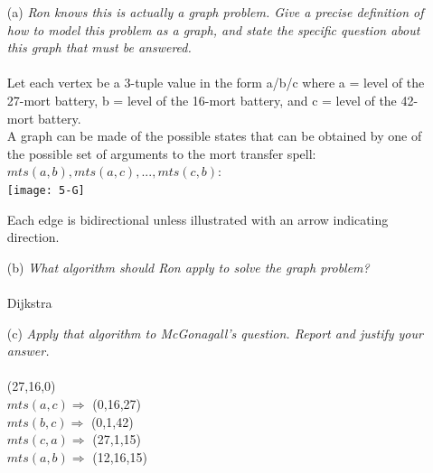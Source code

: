 \documentclass[12pt]{article} \setlength{\oddsidemargin}{0in}
\begin{document}
\begin{enumerate}
\item[(a)]{\textit{Ron knows this is actually a graph problem. Give a
      precise definition of how to model this problem as a graph, and
      state the specific question about this graph that must be
      answered.}}
  \\\\
  Let each vertex be a 3-tuple value in the form a/b/c where a = level of the 27-mort battery, b = level of the 16-mort battery, and c = level of the 42-mort battery. \\
  A graph can be made of the possible states that can be obtained by one of the possible set of arguments to the mort transfer spell: $mts(a,b), mts(a,c), ... , mts(c,b)$: \\
  \texttt{[image: 5-G]}

  Each edge is bidirectional unless illustrated with an arrow indicating direction. 
  \pagebreak
\item[(b)]{\textit{What algorithm should Ron apply to solve the graph
      problem?}}
  \\\\
  Dijkstra
  \\
\item[(c)]{\textit{Apply that algorithm to McGonagall’s
      question. Report and justify your answer.}}
  \\\\
(27,16,0) \\
$ mts(a,c) \Rightarrow$ (0,16,27) \\
$ mts(b,c) \Rightarrow$ (0,1,42) \\
$ mts(c,a) \Rightarrow$ (27,1,15) \\
$ mts(a,b) \Rightarrow$ (12,16,15)

\end{enumerate}
  
\end{document}
